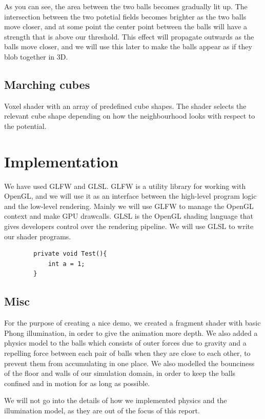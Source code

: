 \documentclass{article}
\begin{document}
            As you can see, the area between the two balls becomes gradually lit up.
            The intersection between the two potetial fields becomes brighter as the two balls move closer, and at some point the center point between the balls will have a strength that is above our threshold. This effect will propagate outwards as the balls move closer, and we will use this later to make the balls appear as if they blob together in 3D.

        \subsection{Marching cubes}
            Voxel shader with an array of predefined cube shapes. The shader selects the relevant cube shape depending on how the neighbourhood looks with respect to the potential.

    \section{Implementation}

        We have used GLFW and GLSL. GLFW is a utility library for working with OpenGL, and we will use it as an interface between the high-level program logic and the low-level rendering. Mainly we will use GLFW to manage the OpenGL context and make GPU drawcalls. GLSL is the OpenGL shading language that gives developers control over the rendering pipeline. We will use GLSL to write our shader programs.

        \begin{lstlisting}
        private void Test(){
            int a = 1;
        }
        \end{lstlisting}

        \subsection{Misc}
            For the purpose of creating a nice demo, we created a fragment shader with basic Phong illumination, in order to give the animation more depth.
            We also added a physics model to the balls which consists of outer forces due to gravity and a repelling force between each pair of balls when they are close to each other, to prevent them from accumulating in one place.
            We also modelled the bounciness of the floor and walls of our simulation domain, in order to keep the balls confined and in motion for as long as possible.

            We will not go into the details of how we implemented physics and the illumination model, as they are out of the focus of this report.
\end{document}

